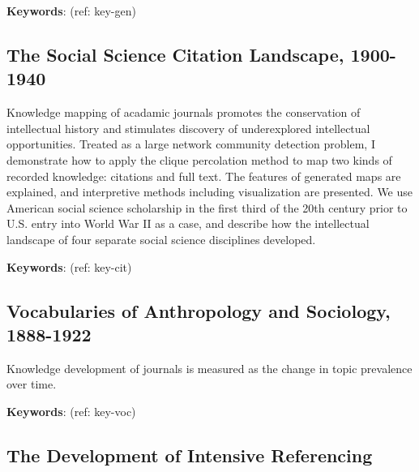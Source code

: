 \documentclass[]{book}
\theoremstyle{definition}
\theoremstyle{definition}
\theoremstyle{definition}
\theoremstyle{remark}
\begin{document}
\textbf{Keywords}: (ref: key-gen)

\hypertarget{the-social-science-citation-landscape-1900-1940}{%
\subsection*{The Social Science Citation Landscape,
1900-1940}\label{the-social-science-citation-landscape-1900-1940}}













Knowledge mapping of acadamic journals promotes the
conservation of intellectual history and stimulates discovery of
underexplored intellectual opportunities. Treated as a large network
community detection problem, I demonstrate how to apply the clique
percolation method to map two kinds of recorded knowledge: citations and
full text. The features of generated maps are explained, and
interpretive methods including visualization are presented. We use
American social science scholarship in the first third of the 20th
century prior to U.S. entry into World War II as a case, and describe
how the intellectual landscape of four separate social science
disciplines developed.




\textbf{Keywords}: (ref: key-cit)

\hypertarget{vocabularies-of-anthropology-and-sociology-1888-1922}{%
\subsection*{Vocabularies of Anthropology and Sociology,
1888-1922}\label{vocabularies-of-anthropology-and-sociology-1888-1922}}




Knowledge development of journals is measured as the
change in topic prevalence over time.




\textbf{Keywords}: (ref: key-voc)

\hypertarget{the-development-of-intensive-referencing}{%
\subsection*{The Development of Intensive
Referencing}\label{the-development-of-intensive-referencing}}
\end{document}
